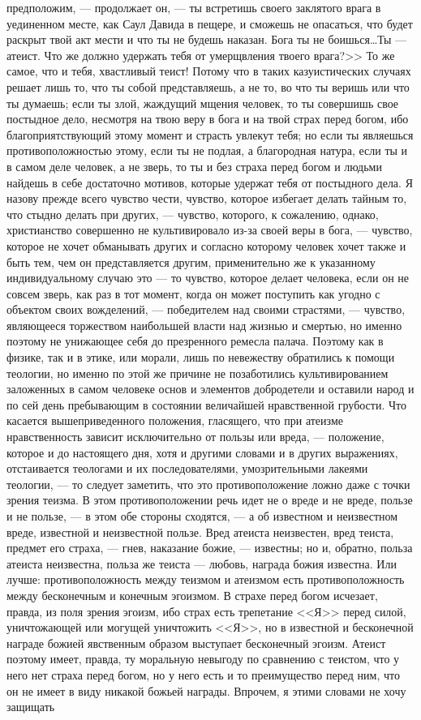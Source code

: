 \documentclass[12pt]{article}
\begin{document}
предположим, --- продолжает он, --- ты встретишь своего заклятого врага в уединенном месте, как Саул Давида в пещере, и сможешь не опасаться, что будет раскрыт твой акт мести и что ты не будешь наказан. Бога ты не боишься\dots Ты --- атеист. Что же должно удержать тебя от умерщвления твоего врага?>> То же самое, что и тебя, хвастливый теист! Потому что в таких казуистических случаях решает лишь то, что ты собой представляешь, а не то, во что ты веришь или что ты думаешь; если ты злой, жаждущий мщения человек, то ты совершишь свое постыдное дело, несмотря на твою веру в бога и на твой страх перед богом, ибо благоприятствующий этому момент и страсть увлекут тебя; но если ты являешься противоположностью этому, если ты не подлая, а благородная натура, если ты и в самом деле человек, а не зверь, то ты и без страха перед богом и людьми найдешь в себе достаточно мотивов, которые удержат тебя от постыдного дела. Я назову прежде всего чувство чести, чувство, которое избегает делать тайным то, что стыдно делать при других, --- чувство, которого, к сожалению, однако, христианство совершенно не культивировало из-за своей веры в бога, --- чувство, которое не хочет обманывать других и согласно которому человек хочет также и быть тем, чем он представляется другим, применительно же к указанному индивидуальному случаю это --- то чувство, которое делает человека, если он не совсем зверь, как раз в тот момент, когда он может поступить как угодно с объектом своих вожделений, --- победителем над своими страстями, --- чувство, являющееся торжеством наибольшей власти над жизнью и смертью, но именно поэтому не унижающее себя до презренного ремесла палача. Поэтому как в физике, так и в этике, или морали, лишь по невежеству обратились к помощи теологии, но именно по этой же причине не позаботились культивированием заложенных в самом человеке основ и элементов добродетели и оставили народ и по сей день пребывающим в состоянии величайшей нравственной грубости. Что касается вышеприведенного положения, гласящего, что при атеизме нравственность зависит исключительно от пользы или вреда, --- положение, которое и до настоящего дня, хотя и другими словами и в других выражениях, отстаивается теологами и их последователями, умозрительными лакеями теологии, --- то следует заметить, что это противоположение ложно даже с точки зрения теизма. В этом противоположении речь идет не о вреде и не вреде, пользе и не пользе, --- в этом обе стороны сходятся, --- а об известном и неизвестном вреде, известной и неизвестной пользе. Вред атеиста неизвестен, вред теиста, предмет его страха, --- гнев, наказание божие, --- известны; но и, обратно, польза атеиста неизвестна, польза же теиста --- любовь, награда божия известна. Или лучше: противоположность между теизмом и атеизмом есть противоположность между бесконечным и конечным эгоизмом. В страхе перед богом исчезает, правда, из поля зрения эгоизм, ибо страх есть трепетание <<Я>> перед силой, уничтожающей или могущей уничтожить <<Я>>, но в известной и бесконечной награде божией явственным образом выступает бесконечный эгоизм. Атеист поэтому имеет, правда, ту моральную невыгоду по сравнению с теистом, что у него нет страха перед богом, но у него есть и то преимущество перед ним, что он не имеет в виду никакой божьей награды. Впрочем, я этими словами не хочу защищать 
\end{document}
